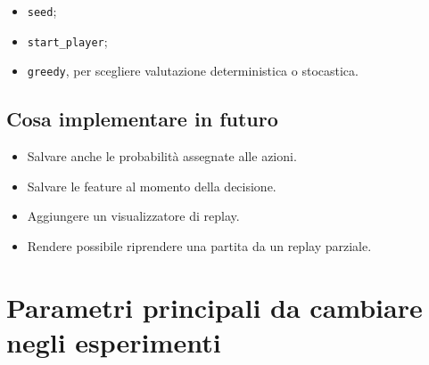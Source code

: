 \documentclass[11pt,a4paper]{article}
\begin{document}
\begin{itemize}
  \item \texttt{seed};
  \item \texttt{start\_player};
  \item \texttt{greedy}, per scegliere valutazione deterministica o stocastica.
\end{itemize}

\subsection{Cosa implementare in futuro}

\begin{itemize}
  \item Salvare anche le probabilità assegnate alle azioni.
  \item Salvare le feature al momento della decisione.
  \item Aggiungere un visualizzatore di replay.
  \item Rendere possibile riprendere una partita da un replay parziale.
\end{itemize}

\section{Parametri principali da cambiare negli esperimenti}
\end{document}
